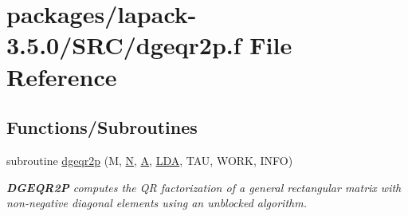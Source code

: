 \hypertarget{dgeqr2p_8f}{}\section{packages/lapack-\/3.5.0/\+S\+R\+C/dgeqr2p.f File Reference}
\label{dgeqr2p_8f}
\subsection*{Functions/\+Subroutines}
\begin{DoxyCompactItemize}
\item 
subroutine \hyperlink{group__doubleGEcomputational_gacc8649ebced520728bc7086b786c7ff1}{dgeqr2p} (M, \hyperlink{polmisc_8c_a0240ac851181b84ac374872dc5434ee4}{N}, \hyperlink{classA}{A}, \hyperlink{example__user_8c_ae946da542ce0db94dced19b2ecefd1aa}{L\+D\+A}, T\+A\+U, W\+O\+R\+K, I\+N\+F\+O)
\begin{DoxyCompactList}\small\item\em {\bfseries D\+G\+E\+Q\+R2\+P} computes the Q\+R factorization of a general rectangular matrix with non-\/negative diagonal elements using an unblocked algorithm. \end{DoxyCompactList}\end{DoxyCompactItemize}
